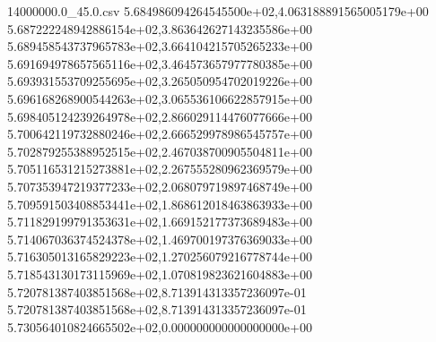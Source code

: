 \begin{filecontents*}{14000000.0_45.0.csv}
5.684986094264545500e+02,4.063188891565005179e+00
5.687222248942886154e+02,3.863642627143235586e+00
5.689458543737965783e+02,3.664104215705265233e+00
5.691694978657565116e+02,3.464573657977780385e+00
5.693931553709255695e+02,3.265050954702019226e+00
5.696168268900544263e+02,3.065536106622857915e+00
5.698405124239264978e+02,2.866029114476077666e+00
5.700642119732880246e+02,2.666529978986545757e+00
5.702879255388952515e+02,2.467038700905504811e+00
5.705116531215273881e+02,2.267555280962369579e+00
5.707353947219377233e+02,2.068079719897468749e+00
5.709591503408853441e+02,1.868612018463863933e+00
5.711829199791353631e+02,1.669152177373689483e+00
5.714067036374524378e+02,1.469700197376369033e+00
5.716305013165829223e+02,1.270256079216778744e+00
5.718543130173115969e+02,1.070819823621604883e+00
5.720781387403851568e+02,8.713914313357236097e-01
5.720781387403851568e+02,8.713914313357236097e-01
5.730564010824665502e+02,0.000000000000000000e+00
\end{filecontents*}


